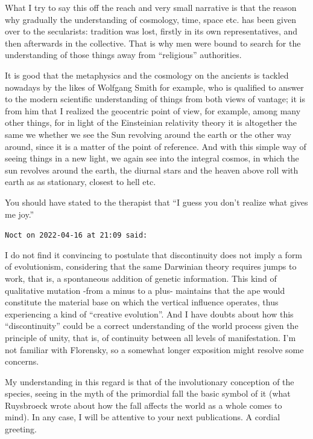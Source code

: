 \begin{footnotesize}
\begin{sffamily}
What I try to say this off the reach and very small narrative is that the reason why gradually the understanding of cosmology, time, space etc. has been given over to the secularists: tradition was lost, firstly in its own representatives, and then afterwards in the collective. That is why men were bound to search for the understanding of those things away from ``religious'' authorities.

It is good that the metaphysics and the cosmology on the ancients is tackled nowadays by the likes of Wolfgang Smith for example, who is qualified to answer to the modern scientific understanding of things from both views of vantage; it is from him that I realized the geocentric point of view, for example, among many other things, for in light of the Einsteinian relativity theory it is altogether the same we whether we see the Sun revolving around the earth or the other way around, since it is a matter of the point of reference. And with this simple way of seeing things in a new light, we again see into the integral cosmos, in which the sun revolves around the earth, the diurnal stars and the heaven above roll with earth as as stationary, closest to hell etc.

You should have stated to the therapist that ``I guess you don't realize what gives me joy.''

\hfill

\texttt{Noct on 2022-04-16 at 21:09 said:}

I do not find it convincing to postulate that discontinuity does not imply a form of evolutionism, considering that the same Darwinian theory requires jumps to work, that is, a spontaneous addition of genetic information. This kind of qualitative mutation -from a minus to a plus- maintains that the ape would constitute the material base on which the vertical influence operates, thus experiencing a kind of ``creative evolution''. And I have doubts about how this ``discontinuity'' could be a correct understanding of the world process given the principle of unity, that is, of continuity between all levels of manifestation. I'm not familiar with Florensky, so a somewhat longer exposition might resolve some concerns.

My understanding in this regard is that of the involutionary conception of the species, seeing in the myth of the primordial fall the basic symbol of it (what Ruysbroeck wrote about how the fall affects the world as a whole comes to mind). In any case, I will be attentive to your next publications. A cordial greeting.


\end{sffamily}
\end{footnotesize}
